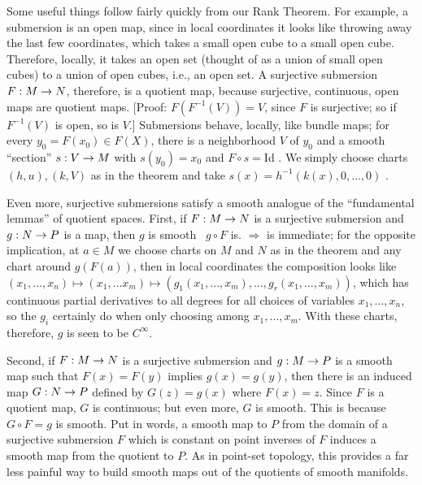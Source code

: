 \msk

Some useful things follow fairly quickly from our Rank Theorem. For example, a 
submersion is an open map, since in local coordinates it looks like throwing away
the last few coordinates, which takes a small open cube to a small open cube.
Therefore, locally, it takes an open set (thought of as a union of small open cubes)
to a union of open cubes, i.e., an open set. A surjective submersion $F:M\rightarrow N$, therefore,
is a quotient map, because surjective, continuous, open maps are quotient maps.
[Proof: $F(F^{-1}(V))=V$, since $F$ is surjective; so if $F^{-1}(V)$ is open, so is $V$.]
Submersions behave, locally, like bundle maps; for every $y_0=F(x_0)\in F(X)$, there is a neighborhood
$V$ of $y_0$ and a smooth ``section'' $s:V\rightarrow M$ with $s(y_0)=x_0$ and $F\circ s=$Id . We simply choose
charts $(h,u),(k,V)$ as in the theorem and take $s(x)=h^{-1}(k(x),0,\ldots,0)$ .

Even more, surjective submersions satisfy a smooth analogue of the ``fundamental lemmas''
of quotient spaces. First, if $F:M\rightarrow N$ is a surjective submersion and 
$g:N\rightarrow P$ is a map, then $g$ is smooth \lra\ $g\circ F$ is. $\Rightarrow$ is immediate;
for the opposite implication, at $a\in M$ we choose charts on $M$ and $N$ as in the theorem
and any chart around $g(F(a))$, then in local coordinates the composition looks like
$(x_1,\ldots ,x_n)\mapsto (x_1,\ldots x_m)\mapsto (g_1(x_1,\ldots ,x_m),\ldots ,g_r(x_1,\ldots ,x_m))$,
which has continuous partial derivatives to all degrees for all choices of variables $x_1,\ldots ,x_n$,
so the $g_i$ certainly do when only choosing among $x_1,\ldots ,x_m$. With these charts, therefore, $g$
is seen to be $C^\infty$. 

Second, if $F:M\rightarrow N$ is a surjective submersion and $g:M\rightarrow P$ is a smooth map such that
$F(x)=F(y)$ implies $g(x)=g(y)$, then there is an induced map
$G:N\rightarrow P$ defined by $G(z)=g(x)$ where $F(x)=z$. Since $F$ is a quotient map, $G$ is 
continuous; but even more, $G$ is smooth. This is because $G\circ F = g$ is smooth. Put
in words, a smooth map to $P$ from the domain of a surjective submersion $F$ which is constant on 
point inverses of $F$ induces a smooth map from the quotient to $P$. As in point-set topology, 
this provides a far less painful way to build smooth maps out of the quotients of smooth
manifolds.

\msk

